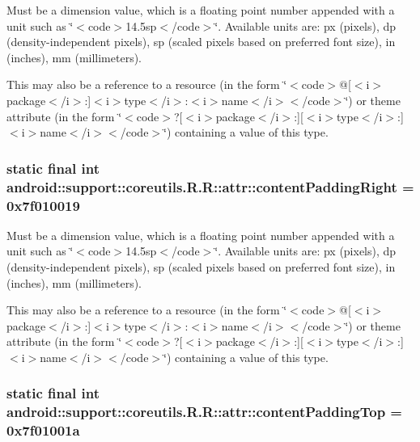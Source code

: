 Must be a dimension value, which is a floating point number appended with a unit such as \char`\"{}$<$code$>$14.5sp$<$/code$>$\char`\"{}. Available units are: px (pixels), dp (density-independent pixels), sp (scaled pixels based on preferred font size), in (inches), mm (millimeters). 

This may also be a reference to a resource (in the form \char`\"{}$<$code$>$@\mbox{[}$<$i$>$package$<$/i$>$:\mbox{]}$<$i$>$type$<$/i$>$:$<$i$>$name$<$/i$>$$<$/code$>$\char`\"{}) or theme attribute (in the form \char`\"{}$<$code$>$?\mbox{[}$<$i$>$package$<$/i$>$:\mbox{]}\mbox{[}$<$i$>$type$<$/i$>$:\mbox{]}$<$i$>$name$<$/i$>$$<$/code$>$\char`\"{}) containing a value of this type. \hypertarget{classandroid_1_1support_1_1coreutils_1_1_r_1_1attr_6d2f18478b60aa089d42b6330b4e8dfd}{
\subsubsection[{contentPaddingRight}]{\setlength{\rightskip}{0pt plus 5cm}static final int android::support::coreutils.R.R::attr::contentPaddingRight = 0x7f010019}}
\label{classandroid_1_1support_1_1coreutils_1_1_r_1_1attr_6d2f18478b60aa089d42b6330b4e8dfd}


Must be a dimension value, which is a floating point number appended with a unit such as \char`\"{}$<$code$>$14.5sp$<$/code$>$\char`\"{}. Available units are: px (pixels), dp (density-independent pixels), sp (scaled pixels based on preferred font size), in (inches), mm (millimeters). 

This may also be a reference to a resource (in the form \char`\"{}$<$code$>$@\mbox{[}$<$i$>$package$<$/i$>$:\mbox{]}$<$i$>$type$<$/i$>$:$<$i$>$name$<$/i$>$$<$/code$>$\char`\"{}) or theme attribute (in the form \char`\"{}$<$code$>$?\mbox{[}$<$i$>$package$<$/i$>$:\mbox{]}\mbox{[}$<$i$>$type$<$/i$>$:\mbox{]}$<$i$>$name$<$/i$>$$<$/code$>$\char`\"{}) containing a value of this type. \hypertarget{classandroid_1_1support_1_1coreutils_1_1_r_1_1attr_f3004de7bb3a1f37b8eeae49b6368999}{
\subsubsection[{contentPaddingTop}]{\setlength{\rightskip}{0pt plus 5cm}static final int android::support::coreutils.R.R::attr::contentPaddingTop = 0x7f01001a}}
\label{classandroid_1_1support_1_1coreutils_1_1_r_1_1attr_f3004de7bb3a1f37b8eeae49b6368999}


